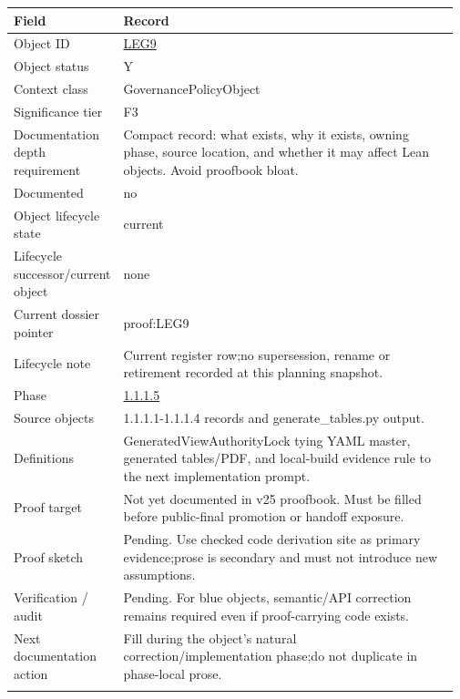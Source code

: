 \begin{longtable}{L{0.16\linewidth} L{0.81\linewidth}}
\hline
\textbf{Field} & \textbf{Record}\\
\hline
Object ID & \hyperlink{object-row-LEG9}{LEG9}\\
\hline\addlinespace[0.20em]
Object status & Y\\
\hline\addlinespace[0.20em]
Context class & GovernancePolicyObject\\
\hline\addlinespace[0.20em]
Significance tier & F3\\
\hline\addlinespace[0.20em]
Documentation depth requirement & Compact record: what exists, why it exists, owning phase, source location, and whether it may affect Lean objects. Avoid proofbook bloat.\\
\hline\addlinespace[0.20em]
Documented & no\\
\hline\addlinespace[0.20em]
Object lifecycle state & current\\
\hline\addlinespace[0.20em]
Lifecycle successor/\allowbreak{}current object & none\\
\hline\addlinespace[0.20em]
Current dossier pointer & proof:LEG9\\
\hline\addlinespace[0.20em]
Lifecycle note & Current register row;\newline no supersession, rename or retirement recorded at this planning snapshot.\\
\hline\addlinespace[0.20em]
Phase & \hyperlink{phase-row-1-1-1-5}{1.1.1.5}\\
\hline\addlinespace[0.20em]
Source objects & 1.1.1.1-1.1.1.4 records and generate\_tables.py output.\\
\hline\addlinespace[0.20em]
Definitions & GeneratedViewAuthorityLock tying YAML master, generated tables/\allowbreak{}PDF, and local-build evidence rule to the next implementation prompt.\\
\hline\addlinespace[0.20em]
Proof target & Not yet documented in v25 proofbook. Must be filled before public-final promotion or handoff exposure.\\
\hline\addlinespace[0.20em]
Proof sketch & Pending. Use checked code derivation site as primary evidence;\newline prose is secondary and must not introduce new assumptions.\\
\hline\addlinespace[0.20em]
Verification /\allowbreak{} audit & Pending. For blue objects, semantic/\allowbreak{}API correction remains required even if proof-carrying code exists.\\
\hline\addlinespace[0.20em]
Next documentation action & Fill during the object's natural correction/\allowbreak{}implementation phase;\newline do not duplicate in phase-local prose.\\
\hline\addlinespace[0.20em]
\end{longtable}
